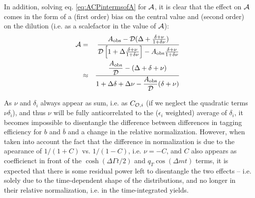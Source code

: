 \documentclass[a4paper,9pt,twosided]{article}
\begin{document}
In addition, solving eq. \ref{eq:ACPintermsofA} for $\cal A$, it is clear that the effect on ${\cal A}$ comes in the form of a (first order) bias on the central value and (second order) on the dilution (i.e. as a scalefactor in the value of ${\cal A}$):
\begin{eqnarray}
    {\cal A} &=& %
\frac{A_{\mathrm{obs}}-{\cal D}(\Delta+\frac{\delta+\nu }{1+\delta\nu})}{ {\cal D}\left[   1+\Delta\frac{\delta+\nu}{1+\delta\nu}\right]-A_{\mathrm{obs}}\frac{\delta+\nu}{1+\delta\nu} } 
\\ &\approx& \frac{ \dfrac{A_{\mathrm{obs}}}{\cal D}-(\Delta+\delta+\nu )}{   1+\Delta\delta+\Delta\nu- \dfrac{A_{\mathrm{obs}}}{\cal D}(\delta+\nu) } 
\end{eqnarray}

As $\nu$ and $\delta_i$ always appear as sum, i.e. as $C_{{\cal O},i}$ (if we neglect the quadratic terms $\nu\delta_i$), and thus $\nu$ will be fully anticorrelated to the ($\epsilon_i$ weighted) average of $\delta_i$,
it becomes impossible to disentangle the difference between differences in tagging efficiency for $b$ and $\overline{b}$
and a change in the relative normalization. However, when taken into account the fact that the difference in normalization
is due to the apearance of $1/(1+C)$ vs. $1/(1-C)$, i.e. $\nu = -C$, and $C$ also appears as coefficienct in front of the $\cosh\left(\Delta\Gamma t/2\right)$
and $q_T\cos(\Delta m t)$ terms, it is expected that there is some residual power left to disentangle the two effects -- i.e. 
solely due to the time-dependent shape of the distributions, and no longer in their relative normalization, i.e. in the time-integrated yields.
\end{document}
